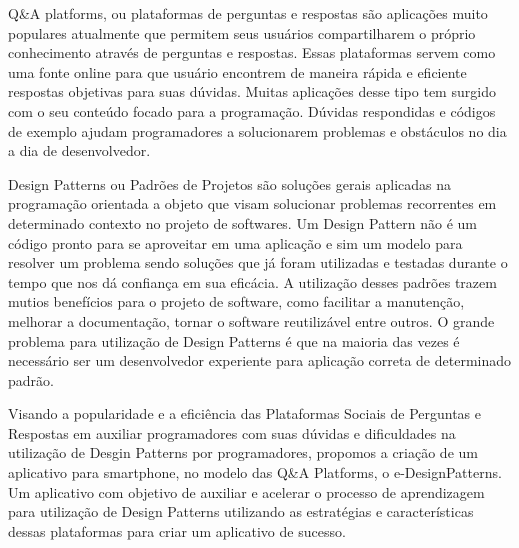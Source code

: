 Q\&A platforms, ou plataformas de perguntas e respostas são aplicações muito populares atualmente que permitem seus usuários compartilharem
 o próprio conhecimento através de perguntas e respostas. Essas plataformas servem como uma fonte online para que usuário encontrem de maneira
 rápida e eficiente respostas objetivas para suas dúvidas. Muitas aplicações desse tipo tem surgido com o seu conteúdo focado para a programação.
 Dúvidas respondidas e códigos de exemplo ajudam programadores a solucionarem problemas e obstáculos no dia a dia de desenvolvedor.

Design Patterns ou Padrões de Projetos são soluções gerais aplicadas na programação orientada a objeto que visam solucionar problemas recorrentes
 em determinado contexto no projeto de softwares. Um Design Pattern não é um código pronto para se aproveitar em uma aplicação e sim um modelo
 para resolver um problema sendo soluções que já foram utilizadas e testadas durante o tempo que nos dá confiança em sua eficácia. A utilização desses
 padrões trazem mutios benefícios para o projeto de software, como facilitar a manutenção, melhorar a documentação, tornar o software reutilizável
 entre outros. O grande problema para utilização de Design Patterns é que na maioria das vezes é necessário ser um desenvolvedor experiente para
 aplicação correta de determinado padrão.

Visando a popularidade e a eficiência das Plataformas Sociais de Perguntas e Respostas em auxiliar programadores com suas dúvidas e dificuldades na utilização de
 Desgin Patterns por programadores, propomos a criação de um aplicativo para smartphone, no modelo das Q\&A Platforms,
 o e-DesignPatterns. Um aplicativo com objetivo de auxiliar e acelerar o processo de aprendizagem para utilização de Design Patterns utilizando as estratégias
 e características dessas plataformas para criar um aplicativo de sucesso.